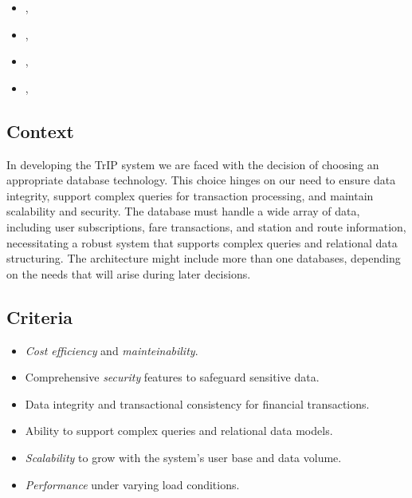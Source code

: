 \begin{itemize}
    \item \userStoryEighteen,
    \item \userStoryTwentyNine,
    \item \userStoryThirty,
    \item \userStoryThirtyTwo,
\end{itemize}

\subsection*{Context}
In developing the TrIP system we are faced with the decision of choosing an appropriate database technology. This choice hinges on our need to ensure data integrity, support complex queries for transaction processing, and maintain scalability and security.
The database must handle a wide array of data, including user subscriptions, fare transactions, and station and route information, necessitating a robust system that supports complex queries and relational data structuring.
The architecture might include more than one databases, depending on the needs that will arise during later decisions.

\subsection*{Criteria}
\begin{itemize}
    \item \textit{Cost efficiency} and \textit{mainteinability}.
    \item Comprehensive \textit{security} features to safeguard sensitive data.
    \item Data integrity and transactional consistency for financial transactions.
    \item Ability to support complex queries and relational data models.
    \item \textit{Scalability} to grow with the system's user base and data volume.
    \item \textit{Performance} under varying load conditions.
\end{itemize}

